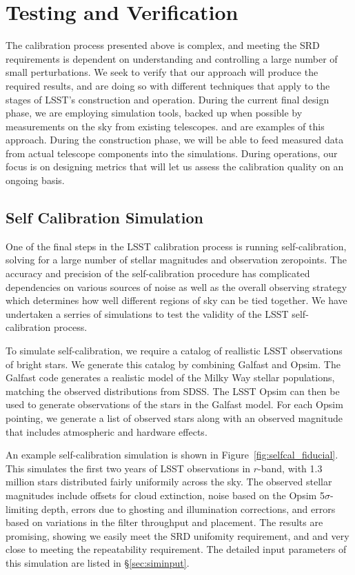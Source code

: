 \documentclass[12pt,preprint]{aastex}
\begin{document}
\section{Testing and Verification}
\label{sec:verification}

The calibration process presented above is complex, and meeting the SRD requirements
is dependent on understanding and controlling a large number of small perturbations.  We seek to verify that our approach will produce the required results, and are doing so with different techniques that apply to the stages of LSST's construction and operation.   During the current final design phase, we are employing simulation tools, backed up when possible by measurements on the sky from existing telescopes.   \citep{Burke2013} and \citep{Burke2010b} are examples of this approach.  During the construction phase, we will be able to feed measured data from actual telescope components into the simulations.   During operations, our focus is on designing metrics that will let us assess the calibration quality on an ongoing basis.

\subsection{Self Calibration Simulation}
\label{sec:selfcalsim}

One of the final steps in the LSST calibration process is running self-calibration, solving for a large number of stellar magnitudes and observation zeropoints.  The accuracy and precision of the self-calibration procedure has complicated dependencies on various sources of noise as well as the overall observing strategy which determines how well different regions of sky can be tied together.  We have undertaken a serries of simulations to test the validity of the LSST self-calibration process.

To simulate self-calibration, we require a catalog of reallistic LSST observations of bright stars.  We generate this catalog by combining Galfast and Opsim.  The Galfast code generates a realistic model of the Milky Way stellar populations, matching the observed distributions from SDSS.  The LSST Opsim can then be used to generate observations of the stars in the Galfast model.  For each Opsim pointing, we generate a list of observed stars along with an observed magnitude that includes atmospheric and hardware effects.  

An example self-calibration simulation is shown in Figure~\ref{fig:selfcal_fiducial}.  This simulates the first two years of LSST observations in $r$-band, with 1.3 million stars distributed fairly uniformily across the sky.  The observed stellar magnitudes include offsets for cloud extinction, noise based on the Opsim 5$\sigma$-limiting depth, errors due to ghosting and illumination corrections, and errors based on variations in the filter throughput and placement.  The results are promising, showing we easily meet the SRD unifomity requirement, and and very close to meeting the repeatability requirement.  The detailed input parameters of this simulation are listed in \S\ref{sec:siminput}.
\end{document}
